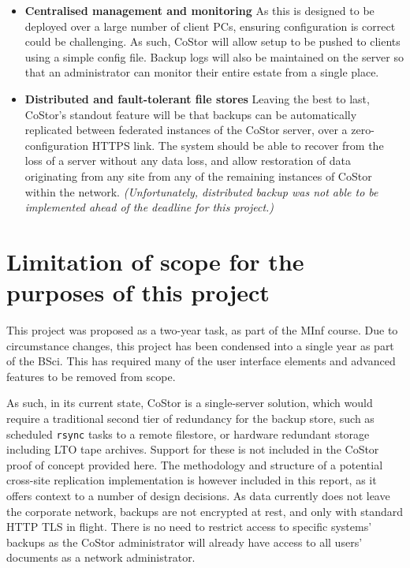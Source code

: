\documentclass[bsc,frontabs,twoside,singlespacing,parskip,deptreport]{infthesis}     %
\begin{document}
\begin{itemize}
	\item \textbf{Centralised management and monitoring}
		\subitem As this is designed to be deployed over a large number of client PCs,
		ensuring configuration is correct could be challenging. As such, CoStor will allow 
		setup to be pushed to clients using a simple config file. Backup
		logs will also be maintained on the server so that an administrator can monitor their
		entire estate from a single place.
	\item \textbf{Distributed and fault-tolerant file stores}
		\subitem Leaving the best to last, CoStor's standout feature will be that backups
		can be automatically replicated between federated instances of the CoStor server, 
		over a zero-configuration HTTPS link. The system should be able to recover from the
		loss of a server without any data loss, and allow restoration of data originating
		from any site from any of the remaining instances of CoStor within the network.
		\subitem \textit{(Unfortunately, distributed backup was not able to be implemented
		ahead of the deadline for this project.)}
\end{itemize}

\section{Limitation of scope for the purposes of this project}

This project was proposed as a two-year task, as part of the MInf course. Due to circumstance
changes, this project has been condensed into a single year as part of the BSci. This has 
required many of the user interface elements and advanced features to be removed from scope.

As such, in its current state, CoStor is a single-server solution, which would require a 
traditional second tier of redundancy for the backup store, such as scheduled \texttt{rsync}
tasks to a remote filestore, or hardware redundant storage including LTO tape archives. 
Support for these is not included in the CoStor proof of concept provided here. The methodology
and structure of a potential cross-site replication implementation is however included in this 
report, as it offers context to a number of design decisions. As data currently does not leave
the corporate network, backups are not encrypted at rest, and only with standard HTTP TLS in 
flight. There is no need to restrict access to specific systems' backups as the CoStor 
administrator will already have access to all users' documents as a network administrator.
\end{document}
